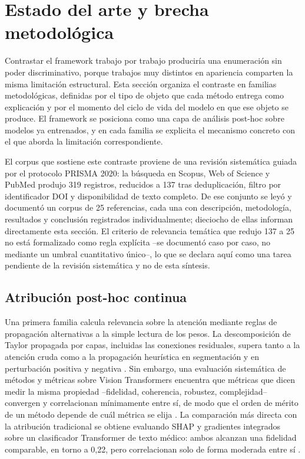 
\section{Estado del arte y brecha metodológica}

Contrastar el framework trabajo por trabajo produciría una enumeración sin poder discriminativo, porque trabajos muy distintos en apariencia comparten la misma limitación estructural. Esta sección organiza el contraste en familias metodológicas, definidas por el tipo de objeto que cada método entrega como explicación y por el momento del ciclo de vida del modelo en que ese objeto se produce. El framework se posiciona como una capa de análisis post-hoc sobre modelos ya entrenados, y en cada familia se explicita el mecanismo concreto con el que aborda la limitación correspondiente.

El corpus que sostiene este contraste proviene de una revisión sistemática guiada por el protocolo PRISMA 2020: la búsqueda en Scopus, Web of Science y PubMed produjo 319 registros, reducidos a 137 tras deduplicación, filtro por identificador DOI y disponibilidad de texto completo. De ese conjunto se leyó y documentó un corpus de 25 referencias, cada una con descripción, metodología, resultados y conclusión registrados individualmente; dieciocho de ellas informan directamente esta sección. El criterio de relevancia temática que redujo 137 a 25 no está formalizado como regla explícita --se documentó caso por caso, no mediante un umbral cuantitativo único--, lo que se declara aquí como una tarea pendiente de la revisión sistemática y no de esta síntesis.

\subsection{Atribución post-hoc continua}

Una primera familia calcula relevancia sobre la atención mediante reglas de propagación alternativas a la simple lectura de los pesos. La descomposición de Taylor propagada por capas, incluidas las conexiones residuales, supera tanto a la atención cruda como a la propagación heurística en segmentación y en perturbación positiva y negativa \cite{chefer2021transformer}. Sin embargo, una evaluación sistemática de métodos y métricas sobre Vision Transformers encuentra que métricas que dicen medir la misma propiedad --fidelidad, coherencia, robustez, complejidad-- convergen y correlacionan mínimamente entre sí, de modo que el orden de mérito de un método depende de cuál métrica se elija \cite{vitexplain2024evaluation}. La comparación más directa con la atribución tradicional se obtiene evaluando SHAP y gradientes integrados sobre un clasificador Transformer de texto médico: ambos alcanzan una fidelidad comparable, en torno a 0,22, pero correlacionan solo de forma moderada entre sí \cite{medtext2026attribution}.

